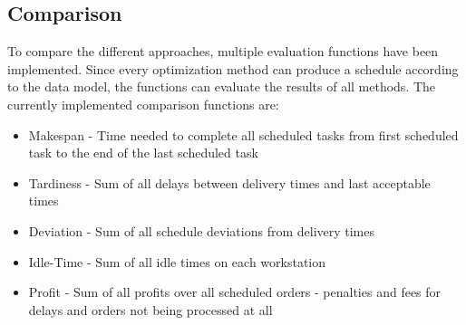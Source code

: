 \documentclass[a4paper,12pt,twoside]{scrreprt}
\begin{document}
\begin{flushleft}
\subsection{Comparison}

To compare the different approaches, multiple evaluation functions have been implemented. Since every optimization method can produce a schedule according to the data model, the functions can evaluate the results of all methods.
The currently implemented comparison functions are:

\begin{itemize}
	\item Makespan - Time needed to complete all scheduled tasks from first scheduled task to the end of the last scheduled task
	\item Tardiness - Sum of all delays between delivery times and last acceptable times
	\item Deviation - Sum of all schedule deviations from delivery times
	\item Idle-Time - Sum of all idle times on each workstation
	\item Profit - Sum of all profits over all scheduled orders - penalties and fees for delays and orders not being processed at all
\end{itemize}

\end{flushleft}
\end{document}
